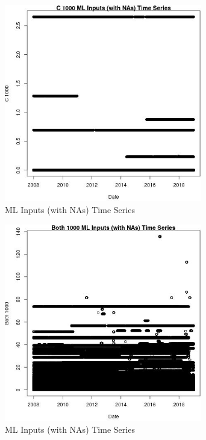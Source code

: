 \begin{figure} 
\centering  
\includegraphics[width=0.77\textwidth]{Code_Outputs/Report_ML_input_PM25_Step4_part_f_de_duplicated_aves_prioritize_24hr_obswNAs_C_1000vDate.jpg} 
\caption{\label{fig:Report_ML_input_PM25_Step4_part_f_de_duplicated_aves_prioritize_24hr_obswNAsC_1000vDate}ML Inputs (with NAs) Time Series} 
\end{figure} 
 

\begin{figure} 
\centering  
\includegraphics[width=0.77\textwidth]{Code_Outputs/Report_ML_input_PM25_Step4_part_f_de_duplicated_aves_prioritize_24hr_obswNAs_Both_1000vDate.jpg} 
\caption{\label{fig:Report_ML_input_PM25_Step4_part_f_de_duplicated_aves_prioritize_24hr_obswNAsBoth_1000vDate}ML Inputs (with NAs) Time Series} 
\end{figure} 
 

